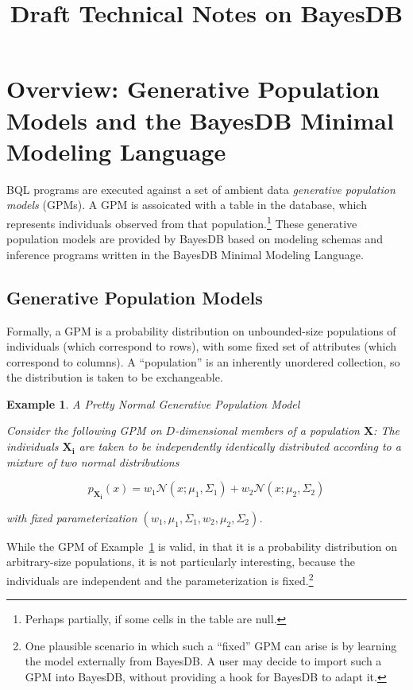 \documentclass[10pt,letterpaper]{article}
\title{Draft Technical Notes on BayesDB}
\newtheorem{example}{Example}[section]
\begin{document}
\maketitle

\section{Overview: Generative Population Models and the BayesDB Minimal Modeling Language}
\label{sec:overview}

BQL programs are executed against a set of ambient data
\textit{generative population models} (GPMs).  A GPM is assoicated
with a table in the database, which represents individuals observed
from that population.\footnote{Perhaps partially, if some cells in the
  table are null.} These generative population models are provided by
BayesDB based on modeling schemas and inference programs written in
the BayesDB Minimal Modeling Language.

\subsection{Generative Population Models}

Formally, a GPM is a probability distribution on unbounded-size
populations of individuals (which correspond to rows), with some fixed
set of attributes (which correspond to columns). A ``population'' is
an inherently unordered collection, so the distribution is taken to be
exchangeable.

\begin{example} \label{ex:normal_gpm} A Pretty Normal Generative Population
Model

Consider the following GPM on $D$-dimensional members of
a population $\mathbf{X}$: The individuals $\mathbf{X_i}$ are taken to
be independently identically distributed according to a mixture of two
normal distributions

\[ p_\mathbf{X_i}(x) = w_1\mathcal{N}(x;\mu_1,\Sigma_1) +
 w_2\mathcal{N}(x;\mu_2,\Sigma_2) \]

with fixed parameterization $(w_1, \mu_1, \Sigma_1, w_2, \mu_2, \Sigma_2)$.
\end{example}

While the GPM of Example~\ref{ex:normal_gpm} is valid, in that it is a
probability distribution on arbitrary-size populations, it is not
particularly interesting, because the individuals are independent and
the parameterization is fixed.\footnote{One plausible scenario in
  which such a ``fixed'' GPM can arise is by learning the model
  externally from BayesDB.  A user may decide to import such a GPM
  into BayesDB, without providing a hook for BayesDB to adapt it.}
\end{document}
